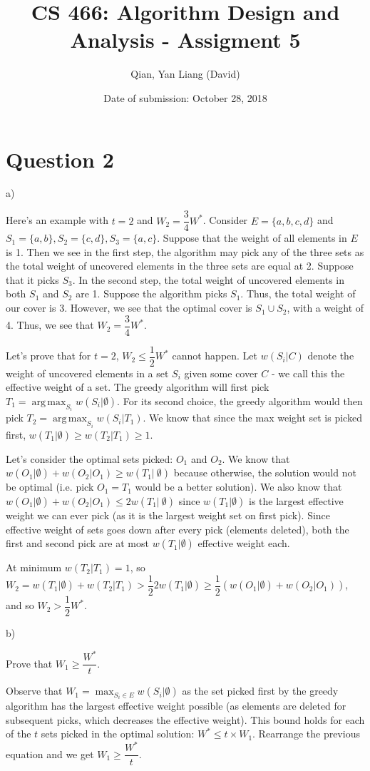 \documentclass{article}
\title{CS 466: Algorithm Design and Analysis - Assigment 5}
\author{Qian, Yan Liang (David)}
\date{Date of submission: October 28, 2018}
\DeclareMathOperator*{\argmax}{arg\,max}
\begin{document}
\newpage

\section{Question 2}

a)

Here's an example with $t = 2$ and $W_{2} = \dfrac{3}{4}W^*$.  Consider $E = \{a, b, c, d\}$ and $S_1 = \{a, b\}, S_2 =
\{c, d\}, S_3 = \{a, c\}$. Suppose that the weight of all elements in $E$ is 1. Then we see in the first step, the
algorithm may pick any of the three sets as the total weight of uncovered elements in the three sets are equal at 2.
Suppose that it picks $S_3$. In the second step, the total weight of uncovered elements in both $S_1$ and $S_2$ are 1.
Suppose the algorithm picks $S_1$. Thus, the total weight of our cover is 3. However, we see that the optimal cover is
$S_1 \cup S_2$, with a weight of 4. Thus, we see that $W_2 = \dfrac{3}{4} W^*$.

Let's prove that for $t = 2$, $W_2 \leq \dfrac{1}{2} W^*$ cannot happen. Let $w(S_i | C)$ denote the weight of uncovered
elements in a set $S_i$ given some cover $C$ - we call this the effective weight of a set. The greedy algorithm will
first pick $T_1 = \argmax_{S_i} w(S_i | \emptyset)$. For its second choice, the greedy algorithm would then pick $T_2 =
\argmax_{S_i} w(S_i | T_1)$. We know that since the max weight set is picked first, $w(T_1 | \emptyset) \geq w(T_2 | T_1
) \geq 1$.

Let's consider the optimal sets picked: $O_1$ and $O_2$. We know that $w(O_1 | \emptyset) + w(O_2 | O_1) \geq w(T_1 | \
\emptyset)$ because otherwise, the solution would not be optimal (i.e. pick $O_1 = T_1$ would be a better solution). We
also know that $w(O_1 | \emptyset) + w(O_2 | O_1) \leq 2w(T_1 | \ \emptyset)$ since $w(T_1 | \emptyset)$ is the largest
effective weight we can ever pick (as it is the largest weight set on first pick). Since effective weight of sets goes
down after every pick (elements deleted), both the first and second pick are at most $w(T_1 | \emptyset)$ effective
weight each.

At minimum $w(T_2 | T_1) = 1$, so $W_2 = w(T_1 | \emptyset) + w(T_2 | T_1) > \dfrac{1}{2} 2 w(T_1 | \emptyset) \geq
\dfrac{1}{2}(w(O_1 | \emptyset) + w(O_2 | O_1))$, and so $W_2 > \dfrac{1}{2} W^*$.


b)

Prove that $W_1 \geq \dfrac{W^*}{t}$.

Observe that $W_1 = \max_{S_i \in E} w(S_i | \emptyset)$ as the set picked first by the greedy algorithm has the largest
effective weight possible (as elements are deleted for subsequent picks, which decreases the effective weight). This
bound holds for each of the $t$ sets picked in the optimal solution: $W^* \leq t \times W_1$. Rearrange the previous
equation and we get $W_1 \geq \dfrac{W^*}{t}$.
\end{document}
